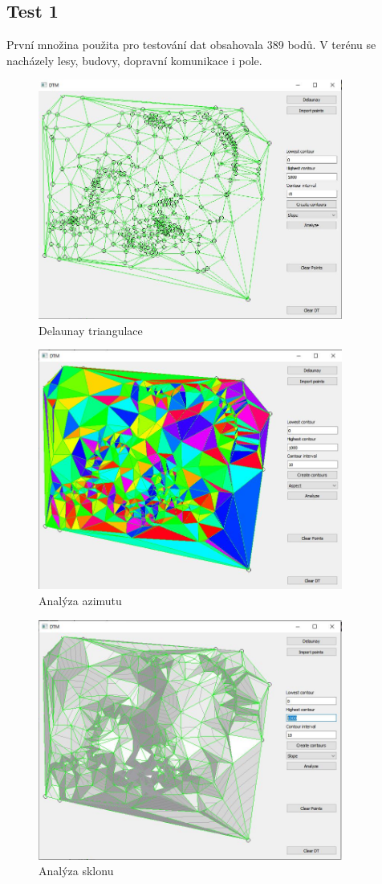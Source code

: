 \documentclass[a4paper, 12pt]{article}
\begin{document}
\newpage

\subsection{Test 1}
První množina použita pro testování dat obsahovala 389 bodů. V terénu se nacházely lesy, budovy, dopravní komunikace i pole. 

 \begin{figure}[h!]
	\centering
	\includegraphics[width=10cm]{test11.jpg}
	\caption{Delaunay triangulace}
\end{figure}

 \begin{figure}[h!]
	\centering
	\includegraphics[width=10cm]{test12.jpg}
	\caption{Analýza azimutu}
\end{figure}

 \begin{figure}[h!]
	\centering
	\includegraphics[width=10cm]{test14.jpg}
	\caption{Analýza sklonu}
\end{figure}
\end{document}
